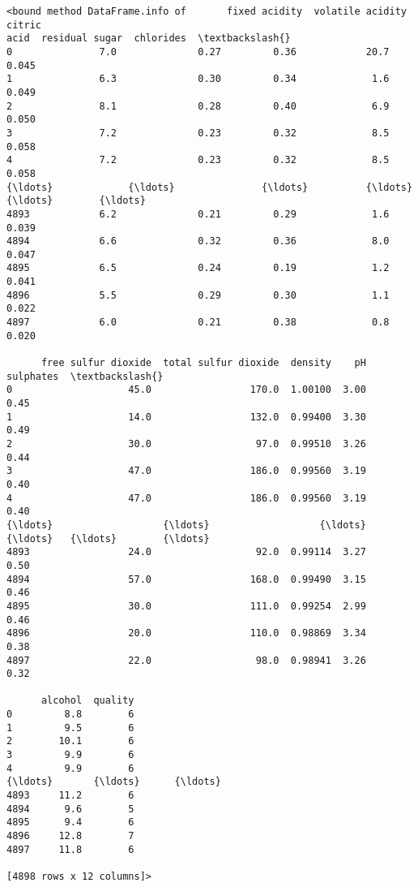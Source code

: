 \documentclass[11pt]{article}
\begin{document}
    \begin{Verbatim}[commandchars=\\\{\}]
<bound method DataFrame.info of       fixed acidity  volatile acidity  citric
acid  residual sugar  chlorides  \textbackslash{}
0               7.0              0.27         0.36            20.7      0.045
1               6.3              0.30         0.34             1.6      0.049
2               8.1              0.28         0.40             6.9      0.050
3               7.2              0.23         0.32             8.5      0.058
4               7.2              0.23         0.32             8.5      0.058
{\ldots}             {\ldots}               {\ldots}          {\ldots}             {\ldots}        {\ldots}
4893            6.2              0.21         0.29             1.6      0.039
4894            6.6              0.32         0.36             8.0      0.047
4895            6.5              0.24         0.19             1.2      0.041
4896            5.5              0.29         0.30             1.1      0.022
4897            6.0              0.21         0.38             0.8      0.020

      free sulfur dioxide  total sulfur dioxide  density    pH  sulphates  \textbackslash{}
0                    45.0                 170.0  1.00100  3.00       0.45
1                    14.0                 132.0  0.99400  3.30       0.49
2                    30.0                  97.0  0.99510  3.26       0.44
3                    47.0                 186.0  0.99560  3.19       0.40
4                    47.0                 186.0  0.99560  3.19       0.40
{\ldots}                   {\ldots}                   {\ldots}      {\ldots}   {\ldots}        {\ldots}
4893                 24.0                  92.0  0.99114  3.27       0.50
4894                 57.0                 168.0  0.99490  3.15       0.46
4895                 30.0                 111.0  0.99254  2.99       0.46
4896                 20.0                 110.0  0.98869  3.34       0.38
4897                 22.0                  98.0  0.98941  3.26       0.32

      alcohol  quality
0         8.8        6
1         9.5        6
2        10.1        6
3         9.9        6
4         9.9        6
{\ldots}       {\ldots}      {\ldots}
4893     11.2        6
4894      9.6        5
4895      9.4        6
4896     12.8        7
4897     11.8        6

[4898 rows x 12 columns]>
    \end{Verbatim}
\end{document}
